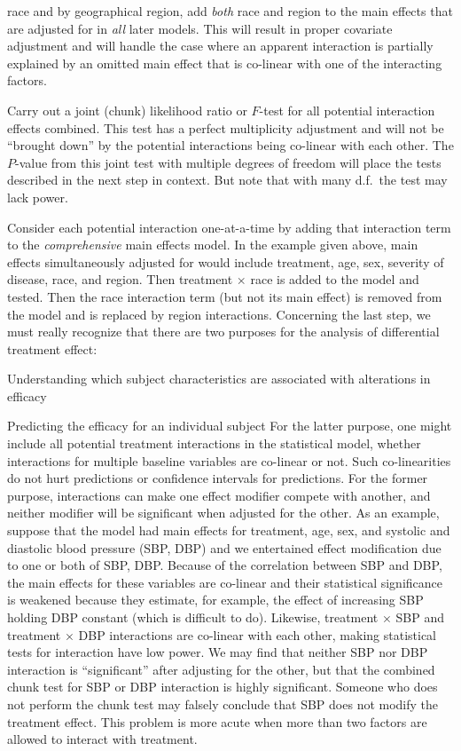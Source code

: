   race and by geographical region, add \emph{both} race and region to the
  main effects that are adjusted for in \emph{all} later models.  This
  will result in proper covariate adjustment and will handle the case
  where an apparent interaction is partially explained by an omitted
  main effect that is co-linear with one of the interacting factors.
\item Carry out a joint (chunk) likelihood ratio or $F$-test for all \ipacue
  potential interaction effects combined.  This test has a perfect
  multiplicity adjustment and will not be ``brought down'' by the
  potential interactions being co-linear with each other.  The
  $P$-value from this joint test with multiple degrees of freedom will
  place the tests described in the next step in context.  But note
  that with many d.f.\ the test may lack power.
\item Consider each potential interaction one-at-a-time by adding that
  interaction term to the \emph{comprehensive} main effects model.  In
  the example given above, main effects simultaneously adjusted for
  would include treatment, age, sex, severity of disease, race, and
  region.  Then treatment $\times$ race is added to the model and
  tested.  Then the race interaction term (but not its main effect) is
  removed from the model and is replaced by region interactions.
\ei
Concerning the last step, we must really recognize that there are two
purposes for the analysis of differential treatment effect:
\be
\item Understanding which subject characteristics are associated with
  alterations in efficacy
\item Predicting the efficacy for an individual subject
\ee
For the latter purpose, one might include all potential treatment
interactions in the statistical model, whether interactions for
multiple baseline variables are co-linear or not.  Such co-linearities
do not hurt predictions or confidence intervals for predictions.  For
the former purpose, interactions can make one effect modifier compete
with another, and neither modifier will be significant when adjusted
for the other.  As an example, suppose that the model had main effects
for treatment, age, sex, and systolic and diastolic blood pressure
(SBP, DBP) and we entertained effect modification due to one or both
of SBP, DBP.  Because of the correlation between SBP and DBP, the main
effects for these variables are co-linear and their statistical
significance is weakened because they estimate, for example, the
effect of increasing SBP holding DBP constant (which is difficult to
do).  Likewise, treatment $\times$ SBP and treatment $\times$ DBP
interactions are co-linear with each other, making statistical tests
for interaction have low power.  We may find that neither SBP nor DBP
interaction is ``significant'' after adjusting for the other, but that
the combined chunk test for SBP or DBP interaction is highly
significant.  Someone who does not perform the chunk test may falsely
conclude that SBP does not modify the treatment effect.
This problem is more acute when more than two factors are allowed to
interact with treatment.

